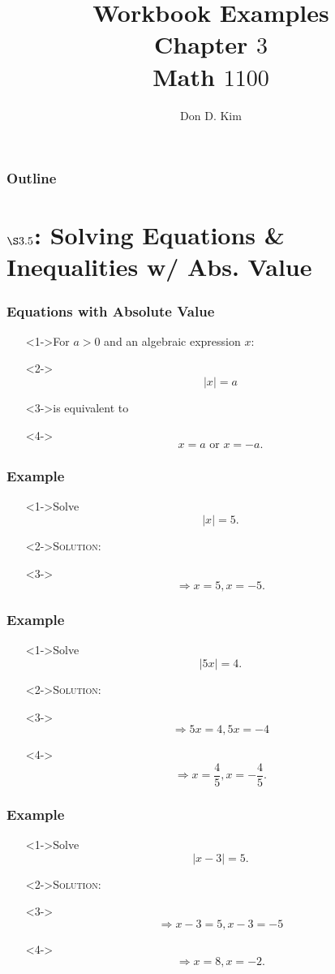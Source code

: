 \documentclass{beamer}
\title{Workbook Examples \\ Chapter $3$ \\ Math $1100$}
\author{Don D. Kim}
\date{\datefmt{\year}{\month}{\day}}
\begin{document}
\begin{frame}
	\titlepage
\end{frame}

\begin{frame}
	\frametitle{Outline}
	\tableofcontents
\end{frame}

\section{$\S 3.5$: Solving Equations \& Inequalities w/ Abs. Value}

\begin{frame}
  \frametitle{Equations with Absolute Value}
  \begin{enumerate}
    \item[]<1->For $a>0$ and an algebraic expression $x$:
    \item[]<2-> \[ |x|=a \]
    \item[]<3->is equivalent to
    \item[]<4->\[ x=a \text{ or } x=-a. \]
  \end{enumerate}
\end{frame}

\begin{frame}
  \frametitle{Example}
  \begin{enumerate}
    \item[]<1->Solve
      \[
        |x|=5.
      \]
    \item[]<2->\textsc{Solution:}
    \item[]<3->\[ \Rightarrow x=5, x=-5.\]
  \end{enumerate}
\end{frame}

\begin{frame}
  \frametitle{Example}
  \begin{enumerate}
    \item[]<1->Solve
      \[
        |5x|=4.
      \]
    \item[]<2->\textsc{Solution:}
    \item[]<3-> \[ \Rightarrow 5x=4, 5x=-4 \]
    \item[]<4-> \[ \Rightarrow x=\frac{4}{5}, x=-\frac{4}{5}.\]
  \end{enumerate}
\end{frame}

\begin{frame}
  \frametitle{Example}
  \begin{enumerate}
    \item[]<1->Solve
      \[
        |x-3|=5.
      \]
    \item[]<2->\textsc{Solution:}
    \item[]<3-> \[ \Rightarrow x-3=5, x-3=-5\]
    \item[]<4-> \[ \Rightarrow x=8, x=-2.\]
  \end{enumerate}
\end{frame}
\end{document}
